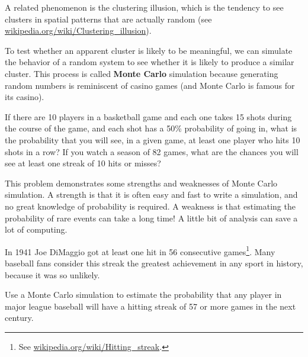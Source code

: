 \documentclass[12pt]{book}
\begin{document}
A related phenomenon is the clustering illusion, which is the
tendency to see clusters in spatial patterns that are actually
random (see \url{wikipedia.org/wiki/Clustering_illusion}).

To test whether an apparent
cluster is likely to be meaningful, we can simulate the behavior
of a random system to see whether it is likely to produce a similar
cluster.  This process is called {\bf Monte Carlo} simulation because
generating random numbers is reminiscent of casino games (and Monte
Carlo is famous for its casino).

\begin{exercise}
If there are 10 players in a basketball game and each one takes
15 shots during the course of the game, and each shot has a
50\% probability of going in, what is the probability that 
you will see, in a given game, at least one player who
hits 10 shots in a row?  If you watch a season of 82 games,
what are the chances you will see at least one streak of
10 hits or misses?

This problem demonstrates some strengths and weaknesses of Monte
Carlo simulation.  A strength is that it is often easy and fast
to write a simulation, and no great knowledge of probability is
required.  A weakness is that estimating the probability of
rare events can take a long time!  A little bit of analysis can
save a lot of computing.

\end{exercise}


\begin{exercise}
In 1941 Joe DiMaggio got at least one hit
in 56 consecutive games\footnote{See
  \url{wikipedia.org/wiki/Hitting_streak}.}.  Many baseball fans
consider this streak the greatest achievement in any sport in history,
because it was so unlikely.

Use a Monte Carlo simulation to estimate the probability that
any player in major league baseball will have a hitting streak
of 57 or more games in the next century.

\end{exercise}
\end{document}
